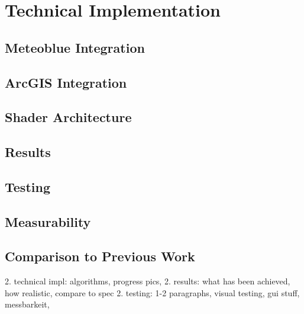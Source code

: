 \section{Technical Implementation}
\label{section:techimpl}

\subsection{Meteoblue Integration}
\label{section:techimpl:meteoblue}

\subsection{ArcGIS Integration}
\label{section:techimpl:arcgis}

\subsection{Shader Architecture}
\label{section:techimpl:architecture}

\subsection{Results}
\label{section:techimpl:results}

\subsection{Testing}
\label{section:techimpl:testing}

\subsection{Measurability}
\label{section:techimpl:measure}

\subsection{Comparison to Previous Work}
\label{section:techimpl:comparison}

2. technical impl: algorithms, progress pics, 
2. results: what has been achieved, how realistic, compare to spec
2. testing: 1-2 paragraphs, visual testing, gui stuff, messbarkeit,
